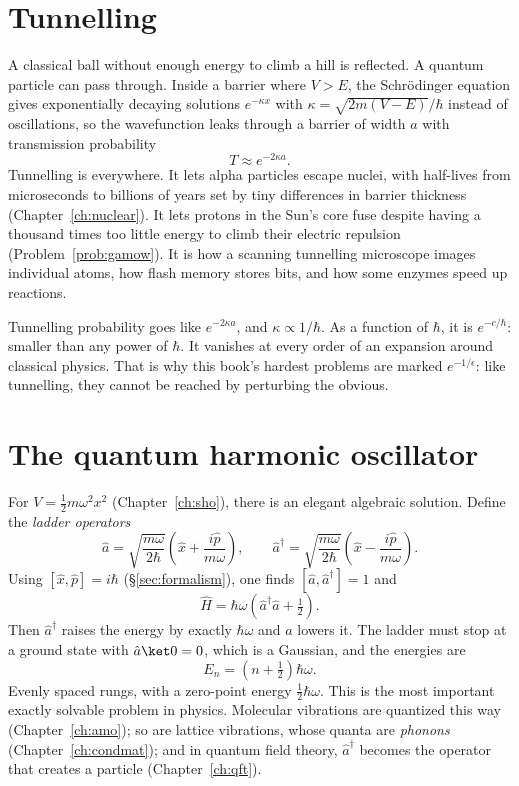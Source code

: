 \section{Tunnelling}

A classical ball without enough energy to climb a hill is reflected. A quantum particle can pass through. Inside a barrier where $V>E$, the Schr\"odinger equation gives exponentially decaying solutions $e^{-\kappa x}$ with $\kappa = \sqrt{2m(V-E)}/\hbar$ instead of oscillations, so the wavefunction leaks through a barrier of width $a$ with transmission probability
\[
  T\approx e^{-2\kappa a}.
\]
Tunnelling is everywhere. It lets alpha particles escape nuclei, with half-lives from microseconds to billions of years set by tiny differences in barrier thickness (Chapter~\ref{ch:nuclear}). It lets protons in the Sun's core fuse despite having a thousand times too little energy to climb their electric repulsion (Problem~\ref{prob:gamow}). It is how a scanning tunnelling microscope images individual atoms, how flash memory stores bits, and how some enzymes speed up reactions.

\begin{keyidea}
Tunnelling probability goes like $e^{-2\kappa a}$, and $\kappa\propto1/\hbar$. As a function of $\hbar$, it is $e^{-c/\hbar}$: smaller than any power of $\hbar$. It vanishes at every order of an expansion around classical physics. That is why this book's hardest problems are marked $e^{-1/\epsilon}$: like tunnelling, they cannot be reached by perturbing the obvious.
\end{keyidea}

\section{The quantum harmonic oscillator}

For $V = \tfrac12m\omega^2x^2$ (Chapter~\ref{ch:sho}), there is an elegant algebraic solution. Define the \emph{ladder operators}
\[
  \hat a = \sqrt{\frac{m\omega}{2\hbar}}\left(\hat x + \frac{i\hat p}{m\omega}\right), \qquad
  \hat a^\dagger = \sqrt{\frac{m\omega}{2\hbar}}\left(\hat x - \frac{i\hat p}{m\omega}\right).
\]
Using $[\hat x,\hat p] = i\hbar$ (\S\ref{sec:formalism}), one finds $[\hat a,\hat a^\dagger] = 1$ and
\[
  \hat H = \hbar\omega\left(\hat a^\dagger\hat a + \tfrac12\right).
\]
Then $\hat a^\dagger$ raises the energy by exactly $\hbar\omega$ and $\hat a$ lowers it. The ladder must stop at a ground state with $\hat a\ket0 = 0$, which is a Gaussian, and the energies are
\[
  E_n = \left(n+\tfrac12\right)\hbar\omega .
\]
Evenly spaced rungs, with a zero-point energy $\tfrac12\hbar\omega$. This is the most important exactly solvable problem in physics. Molecular vibrations are quantized this way (Chapter~\ref{ch:amo}); so are lattice vibrations, whose quanta are \emph{phonons} (Chapter~\ref{ch:condmat}); and in quantum field theory, $\hat a^\dagger$ becomes the operator that creates a particle (Chapter~\ref{ch:qft}).

